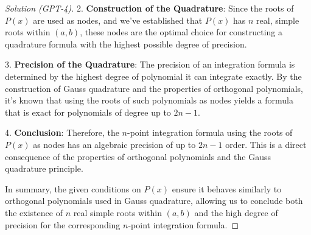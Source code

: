 \documentclass[11pt]{article}
\numberwithin{equation}{section}
\begin{document}
\begin{proof}[Solution (GPT-4)]
2. \textbf{Construction of the Quadrature}: Since the roots of $P(x)$ are used as nodes, and we've established that $P(x)$ has $n$ real, simple roots within $(a, b)$, these nodes are the optimal choice for constructing a quadrature formula with the highest possible degree of precision.

3. \textbf{Precision of the Quadrature}: The precision of an integration formula is determined by the highest degree of polynomial it can integrate exactly. By the construction of Gauss quadrature and the properties of orthogonal polynomials, it's known that using the roots of such polynomials as nodes yields a formula that is exact for polynomials of degree up to $2n-1$.

4. \textbf{Conclusion}: Therefore, the $n$-point integration formula using the roots of $P(x)$ as nodes has an algebraic precision of up to $2n-1$ order. This is a direct consequence of the properties of orthogonal polynomials and the Gauss quadrature principle.

In summary, the given conditions on $P(x)$ ensure it behaves similarly to orthogonal polynomials used in Gauss quadrature, allowing us to conclude both the existence of $n$ real simple roots within $(a, b)$ and the high degree of precision for the corresponding $n$-point integration formula.

\end{proof}
\end{document}
